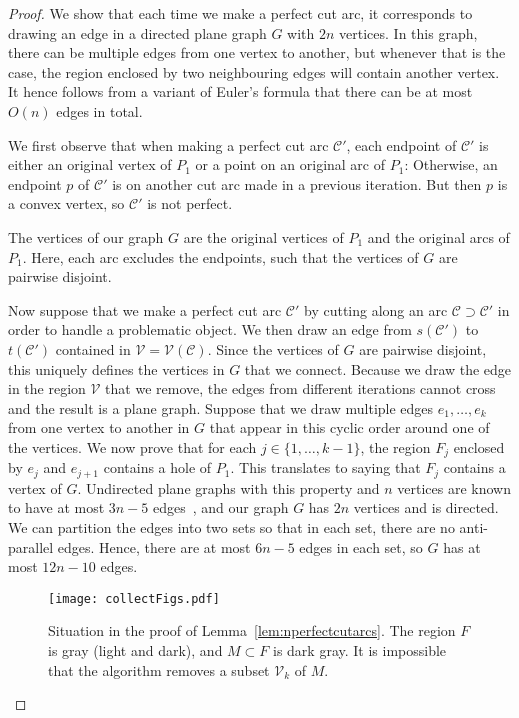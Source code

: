 \documentclass{article}
\newcommand{\PP}{P}
\newcommand{\VV}{\mathcal V}
\newcommand{\cut}{\mathcal C}
\newcommand{\start}{s}
\newcommand{\terminal}{t}
\begin{document}
\begin{proof}
We show that each time we make a perfect cut arc, it corresponds to drawing an edge in a directed plane graph $G$ with $2n$ vertices.
In this graph, there can be multiple edges from one vertex to another, but whenever that is the case, the region enclosed by two neighbouring edges will contain another vertex.
It hence follows from a variant of Euler's formula that there can be at most $O(n)$ edges in total.

We first observe that when making a perfect cut arc $\cut'$, each endpoint of $\cut'$ is either an original vertex of $\PP_1$ or a point on an original arc of $\PP_1$:
Otherwise, an endpoint $p$ of $\cut'$ is on another cut arc made in a previous iteration.
But then $p$ is a convex vertex, so $\cut'$ is not perfect.

The vertices of our graph $G$ are the original vertices of $\PP_1$ and the original arcs of $\PP_1$.
Here, each arc excludes the endpoints, such that the vertices of $G$ are pairwise disjoint.

Now suppose that we make a perfect cut arc $\cut'$ by cutting along an arc $\cut\supset\cut'$ in order to handle a problematic object.
We then draw an edge from $\start(\cut')$ to $\terminal(\cut')$ contained in $\VV=\VV(\cut)$.
Since the vertices of $G$ are pairwise disjoint, this uniquely defines the vertices in $G$ that we connect.
Because we draw the edge in the region $\VV$ that we remove, the edges from different iterations cannot cross and the result is a plane graph.
Suppose that we draw multiple edges $e_1,\ldots,e_k$ from one vertex to another in $G$ that appear in this cyclic order around one of the vertices.
We now prove that for each $j\in\{1,\ldots,k-1\}$, the region $F_j$ enclosed by $e_j$ and $e_{j+1}$ contains a hole of $\PP_1$.
This translates to saying that $F_j$ contains a vertex of $G$.
Undirected plane graphs with this property and $n$ vertices are known to have at most $3n-5$ edges~\cite{abrahamsen2020tiling}, and our graph $G$ has $2n$ vertices and is directed.
We can partition the edges into two sets so that in each set, there are no anti-parallel edges.
Hence, there are at most $6n-5$ edges in each set, so $G$ has at most $12n-10$ edges.

\begin{figure}
\centering
\texttt{[image: collectFigs.pdf]}
\caption{Situation in the proof of Lemma~\ref{lem:nperfectcutarcs}.
The region $F$ is gray (light and dark), and $M\subset F$ is dark gray.
It is impossible that the algorithm removes a subset $\VV_k$ of $M$.}
\label{fig:nottwoarcs}
\end{figure}


\end{proof}
\end{document}
